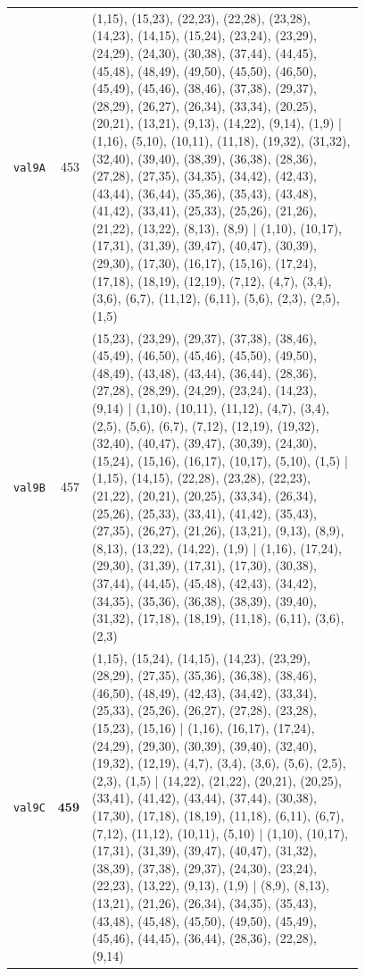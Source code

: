 \begin{landscape}
\begin{longtable}{lr>{\tiny\raggedright\arraybackslash}p{0.78\linewidth}}
\texttt{val9A} & 453 & (1,15), (15,23), (22,23), (22,28), (23,28), (14,23), (14,15), (15,24), (23,24), (23,29), (24,29), (24,30), (30,38), (37,44), (44,45), (45,48), (48,49), (49,50), (45,50), (46,50), (45,49), (45,46), (38,46), (37,38), (29,37), (28,29), (26,27), (26,34), (33,34), (20,25), (20,21), (13,21), (9,13), (14,22), (9,14), (1,9) | (1,16), (5,10), (10,11), (11,18), (19,32), (31,32), (32,40), (39,40), (38,39), (36,38), (28,36), (27,28), (27,35), (34,35), (34,42), (42,43), (43,44), (36,44), (35,36), (35,43), (43,48), (41,42), (33,41), (25,33), (25,26), (21,26), (21,22), (13,22), (8,13), (8,9) | (1,10), (10,17), (17,31), (31,39), (39,47), (40,47), (30,39), (29,30), (17,30), (16,17), (15,16), (17,24), (17,18), (18,19), (12,19), (7,12), (4,7), (3,4), (3,6), (6,7), (11,12), (6,11), (5,6), (2,3), (2,5), (1,5) \\[2pt]
\texttt{val9B} & 457 & (15,23), (23,29), (29,37), (37,38), (38,46), (45,49), (46,50), (45,46), (45,50), (49,50), (48,49), (43,48), (43,44), (36,44), (28,36), (27,28), (28,29), (24,29), (23,24), (14,23), (9,14) | (1,10), (10,11), (11,12), (4,7), (3,4), (2,5), (5,6), (6,7), (7,12), (12,19), (19,32), (32,40), (40,47), (39,47), (30,39), (24,30), (15,24), (15,16), (16,17), (10,17), (5,10), (1,5) | (1,15), (14,15), (22,28), (23,28), (22,23), (21,22), (20,21), (20,25), (33,34), (26,34), (25,26), (25,33), (33,41), (41,42), (35,43), (27,35), (26,27), (21,26), (13,21), (9,13), (8,9), (8,13), (13,22), (14,22), (1,9) | (1,16), (17,24), (29,30), (31,39), (17,31), (17,30), (30,38), (37,44), (44,45), (45,48), (42,43), (34,42), (34,35), (35,36), (36,38), (38,39), (39,40), (31,32), (17,18), (18,19), (11,18), (6,11), (3,6), (2,3) \\[2pt]
\texttt{val9C} & $\mathbf{459}$ & (1,15), (15,24), (14,15), (14,23), (23,29), (28,29), (27,35), (35,36), (36,38), (38,46), (46,50), (48,49), (42,43), (34,42), (33,34), (25,33), (25,26), (26,27), (27,28), (23,28), (15,23), (15,16) | (1,16), (16,17), (17,24), (24,29), (29,30), (30,39), (39,40), (32,40), (19,32), (12,19), (4,7), (3,4), (3,6), (5,6), (2,5), (2,3), (1,5) | (14,22), (21,22), (20,21), (20,25), (33,41), (41,42), (43,44), (37,44), (30,38), (17,30), (17,18), (18,19), (11,18), (6,11), (6,7), (7,12), (11,12), (10,11), (5,10) | (1,10), (10,17), (17,31), (31,39), (39,47), (40,47), (31,32), (38,39), (37,38), (29,37), (24,30), (23,24), (22,23), (13,22), (9,13), (1,9) | (8,9), (8,13), (13,21), (21,26), (26,34), (34,35), (35,43), (43,48), (45,48), (45,50), (49,50), (45,49), (45,46), (44,45), (36,44), (28,36), (22,28), (9,14) \\[2pt]

\end{longtable}
\end{landscape}
